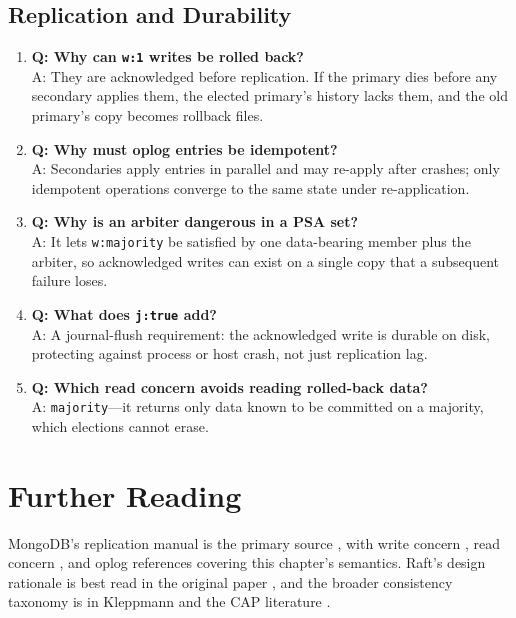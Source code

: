 \subsection{Replication and Durability}
\begin{enumerate}
    \item \textbf{Q: Why can \texttt{w:1} writes be rolled back?}\\
    A: They are acknowledged before replication. If the primary dies before any secondary applies them, the elected primary's history lacks them, and the old primary's copy becomes rollback files.

    \item \textbf{Q: Why must oplog entries be idempotent?}\\
    A: Secondaries apply entries in parallel and may re-apply after crashes; only idempotent operations converge to the same state under re-application.

    \item \textbf{Q: Why is an arbiter dangerous in a PSA set?}\\
    A: It lets \texttt{w:majority} be satisfied by one data-bearing member plus the arbiter, so acknowledged writes can exist on a single copy that a subsequent failure loses.

    \item \textbf{Q: What does \texttt{j:true} add?}\\
    A: A journal-flush requirement: the acknowledged write is durable on disk, protecting against process or host crash, not just replication lag.

    \item \textbf{Q: Which read concern avoids reading rolled-back data?}\\
    A: \texttt{majority}---it returns only data known to be committed on a majority, which elections cannot erase.
\end{enumerate}

\section{Further Reading}
MongoDB's replication manual is the primary source \cite{mongodbReplicationDocs}, with write concern \cite{mongodbWriteConcernDocs}, read concern \cite{mongodbReadConcernDocs}, and oplog \cite{mongodbOplogDocs} references covering this chapter's semantics. Raft's design rationale is best read in the original paper \cite{ongaro2014raft}, and the broader consistency taxonomy is in Kleppmann \cite{kleppmann2017ddia} and the CAP literature \cite{brewer2012cap}.

